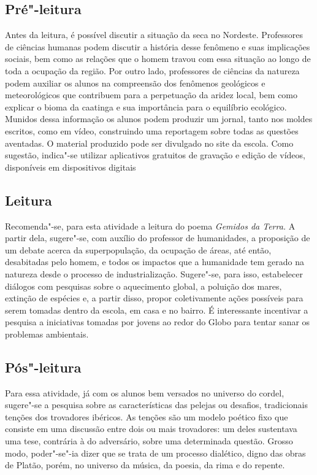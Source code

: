 \documentclass{article}
\begin{document}

\subsection{Pré"-leitura}

Antes da
leitura, é possível discutir a situação da seca no Nordeste. Professores
de ciências humanas podem discutir a história desse fenômeno e suas
implicações sociais, bem como as relações que o homem travou com essa
situação ao longo de toda a ocupação da região. Por outro lado,
professores de ciências da natureza podem auxiliar os alunos na
compreensão dos fenômenos geológicos e meteorológicos que contribuem
para a perpetuação da aridez local, bem como explicar o bioma da
caatinga e sua importância para o equilíbrio ecológico. Munidos dessa
informação os alunos podem produzir um jornal, tanto nos moldes
escritos, como em vídeo, construindo uma reportagem sobre todas as
questões aventadas. O material produzido pode ser divulgado no site da
escola. Como sugestão, indica"-se utilizar aplicativos gratuitos de
gravação e edição de vídeos, disponíveis em dispositivos digitais


\subsection{Leitura}

Recomenda"-se, para esta atividade a leitura do poema
\emph{Gemidos da Terra.} A partir dela, sugere"-se, com auxílio do
professor de humanidades, a proposição de um debate acerca da
superpopulação, da ocupação de áreas, até então, desabitadas pelo homem,
e todos os impactos que a humanidade tem gerado na natureza desde o
processo de industrialização. Sugere"-se, para isso, estabelecer diálogos
com pesquisas sobre o aquecimento global, a poluição dos mares, extinção
de espécies e, a partir disso, propor coletivamente ações possíveis para
serem tomadas dentro da escola, em casa e no bairro. É interessante
incentivar a pesquisa a iniciativas tomadas por jovens ao redor do Globo
para tentar sanar os problemas ambientais.

\subsection{Pós"-leitura}

Para essa atividade, já com os alunos bem versados no
universo do cordel, sugere"-se a pesquisa sobre as características das
pelejas ou desafios, tradicionais tenções dos trovadores ibéricos. As
tenções são um modelo poético fixo que consiste em uma discussão entre
dois ou mais trovadores: um deles sustentava uma tese, contrária à do
adversário, sobre uma determinada questão. Grosso modo, poder"-se"-ia
dizer que se trata de um processo dialético, digno das obras de Platão,
porém, no universo da música, da poesia, da rima e do repente.
\end{document}
